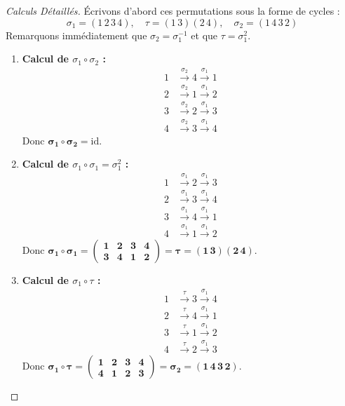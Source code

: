 \documentclass[12pt,a4paper]{report}
\begin{document}
\begin{proof}[Calculs Détaillés]
Écrivons d'abord ces permutations sous la forme de cycles :
\[ \sigma_1 = (1\,2\,3\,4), \quad \tau = (1\,3)(2\,4), \quad \sigma_2 = (1\,4\,3\,2) \]
Remarquons immédiatement que $\sigma_2 = \sigma_1^{-1}$ et que $\tau = \sigma_1^2$.

\begin{enumerate}
    \item \textbf{Calcul de $\sigma_1 \circ \sigma_2$ :}
    \begin{align*}
    1 &\xrightarrow{\sigma_2} 4 \xrightarrow{\sigma_1} 1 \\
    2 &\xrightarrow{\sigma_2} 1 \xrightarrow{\sigma_1} 2 \\
    3 &\xrightarrow{\sigma_2} 2 \xrightarrow{\sigma_1} 3 \\
    4 &\xrightarrow{\sigma_2} 3 \xrightarrow{\sigma_1} 4
    \end{align*}
    Donc $\mathbf{\sigma_1 \circ \sigma_2 = \mathrm{id}}$.

    \item \textbf{Calcul de $\sigma_1 \circ \sigma_1 = \sigma_1^2$ :}
    \begin{align*}
    1 &\xrightarrow{\sigma_1} 2 \xrightarrow{\sigma_1} 3 \\
    2 &\xrightarrow{\sigma_1} 3 \xrightarrow{\sigma_1} 4 \\
    3 &\xrightarrow{\sigma_1} 4 \xrightarrow{\sigma_1} 1 \\
    4 &\xrightarrow{\sigma_1} 1 \xrightarrow{\sigma_1} 2
    \end{align*}
    Donc $\mathbf{\sigma_1 \circ \sigma_1 = \begin{pmatrix} 1 & 2 & 3 & 4 \\ 3 & 4 & 1 & 2 \end{pmatrix} = \tau = (1\,3)(2\,4)}$.

    \item \textbf{Calcul de $\sigma_1 \circ \tau$ :}
    \begin{align*}
    1 &\xrightarrow{\tau} 3 \xrightarrow{\sigma_1} 4 \\
    2 &\xrightarrow{\tau} 4 \xrightarrow{\sigma_1} 1 \\
    3 &\xrightarrow{\tau} 1 \xrightarrow{\sigma_1} 2 \\
    4 &\xrightarrow{\tau} 2 \xrightarrow{\sigma_1} 3
    \end{align*}
    Donc $\mathbf{\sigma_1 \circ \tau = \begin{pmatrix} 1 & 2 & 3 & 4 \\ 4 & 1 & 2 & 3 \end{pmatrix} = \sigma_2 = (1\,4\,3\,2)}$.


\end{enumerate}
\end{proof}
\end{document}
